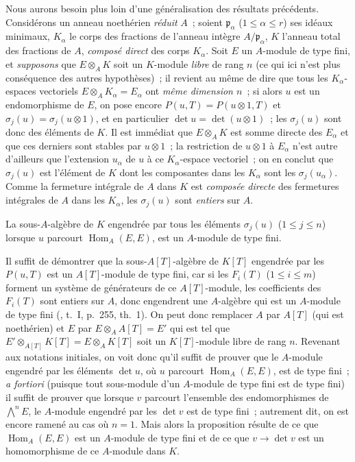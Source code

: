 \begin{remark}[6.4.7]
\label{II.6.4.7-fr}
Nous aurons besoin plus loin d'une généralisation des résultats précédents.
Considérons un anneau noethérien \emph{réduit} $A$~; soient
$\mathfrak{p}_\alpha$ ($1\leq\alpha\leq r$) ses idéaux minimaux, $K_\alpha$
le corps des fractions de l'anneau intègre $A/\mathfrak{p}_\alpha$, $K$
l'anneau total des fractions de $A$, \emph{composé direct} des corps
$K_\alpha$. Soit $E$ un $A$-module de type fini, et \emph{supposons} que
$E\otimes_AK$ soit un $K$-module \emph{libre} de rang $n$ (ce qui ici n'est plus
conséquence des autres hypothèses)~; il revient au même de dire que tous les
$K_\alpha$-espaces vectoriels $E\otimes_AK_\alpha=E_\alpha$ ont \emph{même
dimension $n$}~; si alors $u$ est un endomorphisme de $E$, on pose encore
$P(u,T)=P(u\otimes1,T)$ et $\sigma_j(u)=\sigma_j(u\otimes1)$, et en
particulier $\det u=\det(u\otimes1)$~; les $\sigma_j(u)$ sont donc des
éléments de $K$. Il est immédiat que $E\otimes_AK$ est somme directe des
$E_\alpha$ et que ces derniers sont stables par $u\otimes1$~; la restriction
de $u\otimes1$ à $E_\alpha$ n'est autre d'ailleurs que l'extension $u_\alpha$
de $u$ à ce $K_\alpha$-espace vectoriel~; on en conclut que $\sigma_j(u)$ est
l'élément de $K$ dont les composantes dans les $K_\alpha$ sont les
$\sigma_j(u_\alpha)$. Comme la fermeture intégrale de $A$ dans $K$ est
\emph{composée directe} des fermetures intégrales de $A$ dans les
$K_\alpha$, les $\sigma_j(u)$ sont \emph{entiers} sur $A$.

\begin{lemma}[6.4.7.1]
\label{II.6.4.7.1-fr}
La sous-$A$-algèbre de $K$ engendrée par tous les éléments $\sigma_j(u)$
($1\leq j\leq n$) lorsque $u$ parcourt $\operatorname{Hom}_A(E,E)$, est un
$A$-module de type fini.
\end{lemma}

Il suffit de démontrer que la sous-$A[T]$-algèbre de $K[T]$ engendrée par les
$P(u,T)$ est un $A[T]$-module de type fini, car si les $F_i(T)$
($1\leq i\leq m$) forment un système de générateurs de ce $A[T]$-module, les
coefficients des $F_i(T)$ sont entiers sur $A$, donc engendrent une
$A$-algèbre qui est un $A$-module de type fini
(\cite{I-13}, t.~I, p.~255, th.~1). On peut donc
remplacer $A$ par $A[T]$ (qui est noethérien) et $E$ par
$E\otimes_AA[T]=E'$ qui est tel que
$E'\otimes_{A[T]}K[T]=E\otimes_AK[T]$ soit un $K[T]$-module libre de rang $n$.
Revenant aux notations initiales, on voit donc qu'il suffit de prouver que le
$A$-module engendré par les éléments $\det u$, où $u$ parcourt
$\operatorname{Hom}_A(E,E)$, est de type fini~; \emph{a fortiori} (puisque
tout sous-module d'un $A$-module de type fini est de type fini) il suffit de
prouver que lorsque $v$ parcourt l'ensemble des endomorphismes de
$\bigwedge^nE$, le $A$-module engendré par les $\det v$ est de type fini~;
autrement dit, on est encore ramené au cas où $n=1$. Mais alors la proposition
résulte de ce que $\operatorname{Hom}_A(E,E)$ est un $A$-module de type fini
et de ce que $v\to\det v$ est un homomorphisme de ce $A$-module dans $K$.


\end{remark}
